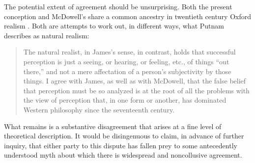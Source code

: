 \documentclass[12pt]{article}
\begin{document}
The potential extent of agreement should be unsurprising. Both the present conception and McDowell's share a common ancestry in twentieth century Oxford realism \citep[see][]{Kalderon:2010fk,Marion:2000ai,Marion:2000kl}. Both are attempts to work out, in different ways, what Putnam describes as natural realism:
\begin{quote}
	The natural realist, in James's sense, in contrast, holds that successful perception is just a seeing, or hearing, or feeling, etc., of things ``out there,'' and not a mere affectation of a person's subjectivity by those things. I agree with James, as well as with McDowell, that the false belief that perception must be so analyzed is at the root of all the problems with the view of perception that, in one form or another, has dominated Western philosophy since the seventeenth century. \citep[454]{Putnam:1994kx}
\end{quote}
What remains is a substantive disagreement that arises at a fine level of theoretical description. It would be disingenuous to claim, in advance of further inquiry, that either party to this dispute has fallen prey to some antecedently understood myth about which there is widespread and noncollusive agreement.


 
 
\end{document}
